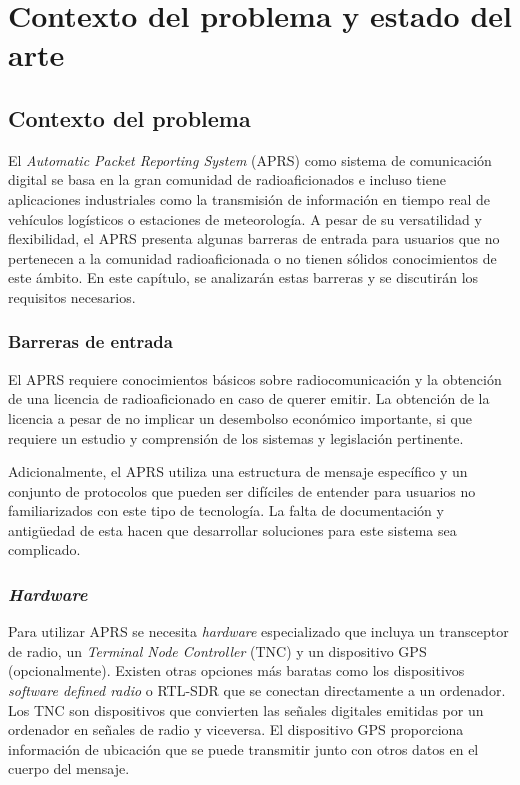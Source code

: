 \chapter{Contexto del problema y estado del arte}
\label{cap:estado_de_la_cuestion}

\section{Contexto del problema}

El \textit{Automatic Packet Reporting System} (APRS) como sistema de comunicación digital se basa en la gran comunidad de radioaficionados e incluso tiene aplicaciones industriales como la transmisión de información en tiempo real de vehículos logísticos o estaciones de meteorología. A pesar de su versatilidad y flexibilidad, el APRS presenta algunas barreras de entrada para usuarios que no pertenecen a la comunidad radioaficionada o no tienen sólidos conocimientos de este ámbito. En este capítulo, se analizarán estas barreras y se discutirán los requisitos necesarios.

\subsection{Barreras de entrada}

El APRS requiere conocimientos básicos sobre radiocomunicación y la obtención de una licencia de radioaficionado en caso de querer emitir. La obtención de la licencia a pesar de no implicar un desembolso económico importante, si que requiere un estudio y comprensión de los sistemas y legislación pertinente.

Adicionalmente, el APRS utiliza una estructura de mensaje específico y un conjunto de protocolos que pueden ser difíciles de entender para usuarios no familiarizados con este tipo de tecnología. La falta de documentación y antigüedad de esta hacen que desarrollar soluciones para este sistema sea complicado.

\subsection{\textit{Hardware}}

Para utilizar APRS se necesita \textit{hardware} especializado que incluya un transceptor de radio, un \textit{Terminal Node Controller} (TNC) y un dispositivo GPS (opcionalmente). Existen otras opciones más baratas como los dispositivos \textit{software defined radio} o RTL-SDR  que se conectan directamente a un ordenador. Los TNC son dispositivos que convierten las señales digitales emitidas por un ordenador en señales de radio y viceversa. El dispositivo GPS proporciona información de ubicación que se puede transmitir junto con otros datos en el cuerpo del mensaje.

